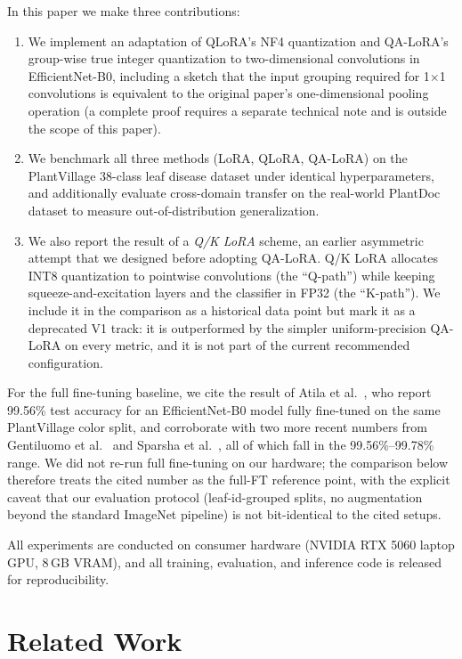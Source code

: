 \documentclass[conference]{IEEEtran}
\begin{document}
In this paper we make three contributions:
\begin{enumerate}
  \item We implement an adaptation of QLoRA's NF4 quantization and QA-LoRA's group-wise true integer quantization to two-dimensional convolutions in EfficientNet-B0, including a sketch that the input grouping required for 1$\times$1 convolutions is equivalent to the original paper's one-dimensional pooling operation (a complete proof requires a separate technical note and is outside the scope of this paper).
  \item We benchmark all three methods (LoRA, QLoRA, QA-LoRA) on the PlantVillage 38-class leaf disease dataset under identical hyperparameters, and additionally evaluate cross-domain transfer on the real-world PlantDoc dataset to measure out-of-distribution generalization.
  \item We also report the result of a \emph{Q/K LoRA} scheme, an earlier asymmetric attempt that we designed before adopting QA-LoRA. Q/K LoRA allocates INT8 quantization to pointwise convolutions (the ``Q-path'') while keeping squeeze-and-excitation layers and the classifier in FP32 (the ``K-path''). We include it in the comparison as a historical data point but mark it as a deprecated V1 track: it is outperformed by the simpler uniform-precision QA-LoRA on every metric, and it is not part of the current recommended configuration.
\end{enumerate}
For the full fine-tuning baseline, we cite the result of Atila et al.~\cite{atila2021}, who report 99.56\% test accuracy for an EfficientNet-B0 model fully fine-tuned on the same PlantVillage color split, and corroborate with two more recent numbers from Gentiluomo et al.~\cite{gentiluomo2022} and Sparsha et al.~\cite{sparsha2025}, all of which fall in the 99.56\%--99.78\% range. We did not re-run full fine-tuning on our hardware; the comparison below therefore treats the cited number as the full-FT reference point, with the explicit caveat that our evaluation protocol (leaf-id-grouped splits, no augmentation beyond the standard ImageNet pipeline) is not bit-identical to the cited setups.

All experiments are conducted on consumer hardware (NVIDIA RTX 5060 laptop GPU, 8\,GB VRAM), and all training, evaluation, and inference code is released for reproducibility.

\section{Related Work}
\end{document}
